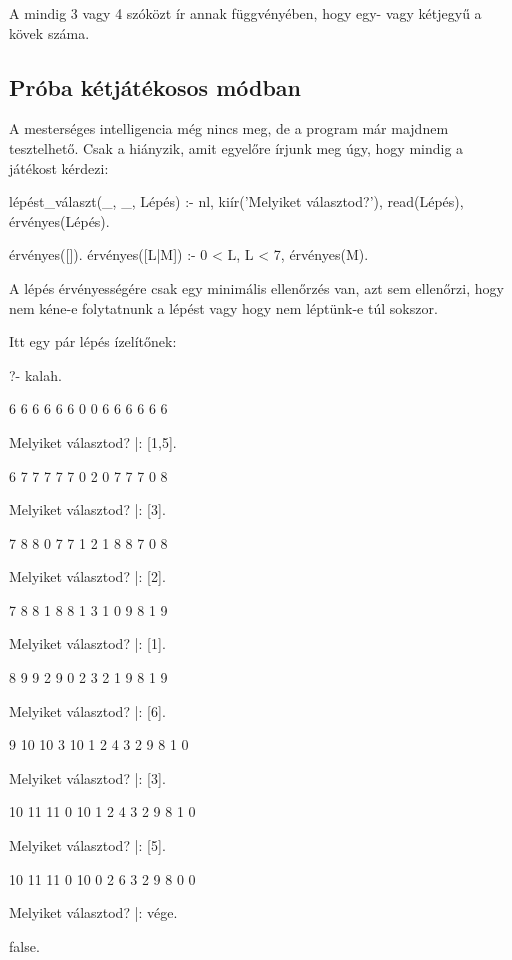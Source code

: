 A  mindig 3 vagy 4 szóközt ír annak
függvényében, hogy egy- vagy kétjegyű a kövek száma.

\subsection*{Próba kétjátékosos módban}
A mesterséges intelligencia még nincs meg, de a
program már majdnem tesztelhető. Csak a
 hiányzik, amit egyelőre írjunk
meg úgy, hogy mindig a játékost kérdezi:
\begin{program}
lépést_választ(_, _, Lépés) :-
    nl, kiír('Melyiket választod?'),
    read(Lépés), érvényes(Lépés).

érvényes([]).
érvényes([L|M]) :- 0 < L, L < 7, érvényes(M).
\end{program}

A lépés érvényességére csak egy minimális ellenőrzés
van, azt sem ellenőrzi, hogy nem kéne-e folytatnunk
a lépést vagy hogy nem léptünk-e túl sokszor.

Itt egy pár lépés ízelítőnek:
\begin{query}
?- kalah.

     6    6    6    6    6    6
0                                  0
     6    6    6    6    6    6

Melyiket választod?
|: [1,5].

     6    7    7    7    7    7
0                                  2
     0    7    7    7    0    8

Melyiket választod?
|: [3].

     7    8    8    0    7    7
1                                  2
     1    8    8    7    0    8

Melyiket választod?
|: [2].

     7    8    8    1    8    8
1                                  3
     1    0    9    8    1    9

Melyiket választod?
|: [1].

     8    9    9    2    9    0
2                                  3
     2    1    9    8    1    9

Melyiket választod?
|: [6].

     9    10   10   3    10   1
2                                  4
     3    2    9    8    1    0

Melyiket választod?
|: [3].

     10   11   11   0    10   1
2                                  4
     3    2    9    8    1    0

Melyiket választod?
|: [5].

     10   11   11   0    10   0
2                                  6
     3    2    9    8    0    0

Melyiket választod?
|: vége.

false.
\end{query}

